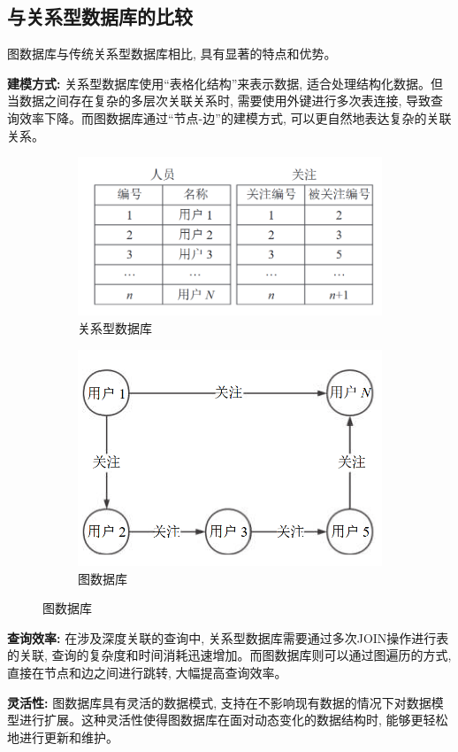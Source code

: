 \subsection{与关系型数据库的比较}

图数据库与传统关系型数据库相比, 具有显著的特点和优势。

\textbf{建模方式:} 关系型数据库使用“表格化结构”来表示数据, 适合处理结构化数据。但当数据之间存在复杂的多层次关联关系时, 需要使用外键进行多次表连接, 导致查询效率下降。而图数据库通过“节点-边”的建模方式, 可以更自然地表达复杂的关联关系。
\begin{figure}[H]
	\centering
	\begin{subfigure}[b]{0.45\textwidth}
		\centering
		\includegraphics[width=\textwidth]{images/1.png}
		\caption{关系型数据库}
	\end{subfigure}
	\hfill
	\begin{subfigure}[b]{0.45\textwidth}
		\centering
		\includegraphics[width=\textwidth]{images/2.png}
		\caption{图数据库}
	\end{subfigure}
\end{figure}


\textbf{查询效率:} 在涉及深度关联的查询中, 关系型数据库需要通过多次JOIN操作进行表的关联, 查询的复杂度和时间消耗迅速增加。而图数据库则可以通过图遍历的方式, 直接在节点和边之间进行跳转, 大幅提高查询效率。

\textbf{灵活性:} 图数据库具有灵活的数据模式, 支持在不影响现有数据的情况下对数据模型进行扩展。这种灵活性使得图数据库在面对动态变化的数据结构时, 能够更轻松地进行更新和维护。
